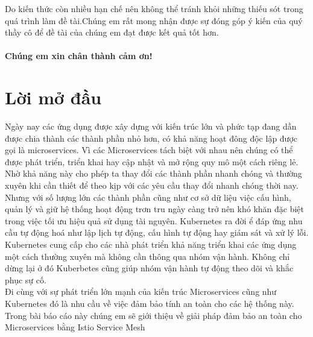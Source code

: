 \documentclass[12pt,a4paper]{report}
\begin{document}
	Do kiến thức còn nhiều hạn chế nên không thể tránh khỏi những thiếu sót trong quá trình làm đề tài.Chúng em rất mong nhận được sự đóng góp ý kiến của quý thầy cô để đề tài của chúng em đạt được kết quả tốt hơn.\\
	\medskip \\
	\textbf{Chúng em xin chân thành cảm ơn!}
	\chapter*{\centering Lời mở đầu}
	\hspace{0.6cm}{Nhiều năm trước, hầu hết các ứng dụng phần mềm đều được xây dựng với kiến trúc monolith hay còn gọi là kiến trúc 1 khối là mẫu thiết kế được dùng nhiều nhất trong giới lập trình web hiện nay bởi tính đơn giản của nó khi phát triển và khi triển khai. Các ứng dụng này chạy dưới dạng một tiến trình đơn lẻ hoặc số lượng nhỏ các tiến trình trên một số ít máy chủ. Chúng có khả năng cập nhật và nâng cấp chậm và yêu cầu nâng cấp thường xuyên. Trong trường hợp có sự cố như lỗi phần cứng hệ thống phần mềm này sẽ phải được di chuyển một cách thủ công sang các máy chủ còn hoạt động tốt.\\}
	
	Ngày nay các ứng dụng được xây dựng với kiến trúc lớn và phức tạp đang dần được chia thành các thành phần nhỏ hơn, có khả năng hoạt đông độc lập được gọi là microservices. Vì các Microservices tách biệt với nhau nên chúng có thể được phát triển, triển khai hay cập nhật và mở rộng quy mô một cách riêng lẻ. Nhờ khả năng này cho phép ta thay đổi các thành phần nhanh chóng và thường xuyên khi cần thiết để theo kịp với các yêu cầu thay đổi nhanh chóng thời nay.\\
	
	Nhưng với số lượng lớn các thành phần cũng như cơ sở dữ liệu việc cấu hình, quản lý và giữ hệ thống hoạt động trơn tru ngày càng trở nên khó khăn đặc biệt trong việc tối ưu hiệu quả sử dụng tài nguyên. Kubernetes ra đời ể đáp ứng nhu cầu tự động hoá như lập lịch tự động, cấu hình tự động hay giám sát và xử lý lỗi.\\
	
	Kubernetes cung cấp cho các nhà phát triển khả năng triển khai các ứng dụng một cách thường xuyên mà không cần thông qua nhóm vận hành. Không chỉ dừng lại ở đó Kuberbetes cũng giúp nhóm vận hành tự động theo dõi và khắc phục sự cố. \\
	
	Đi cùng với sự phát triển lớn mạnh của kiến trúc Microservices cũng như Kubernetes đó là nhu cầu về việc đảm bảo tính an toàn cho các hệ thống này. Trong bài báo cáo này chúng em sẽ giới thiệu về giải pháp đảm bảo an toàn cho Microservices bằng Istio Service Mesh
	
\end{document}
